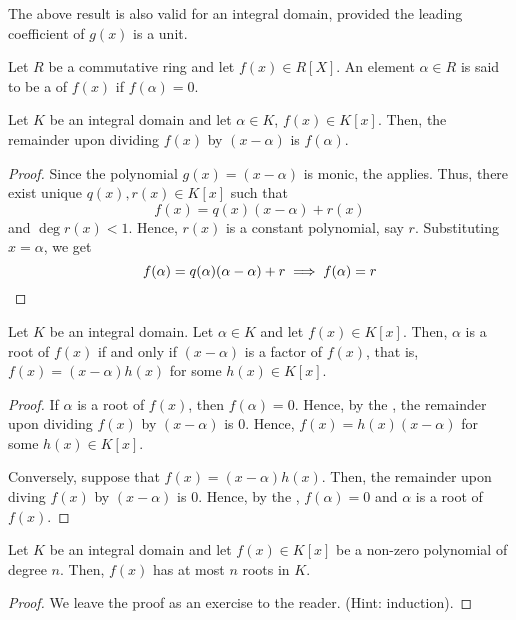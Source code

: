 \begin{rem}
The above result is also valid for an integral domain, provided the leading coefficient of $g(x)$ is a unit.
\end{rem}

\begin{defn}[Root]
    Let $R$ be a commutative ring and let $f(x) \in R[X]$. An element $\alpha \in R$ is said to be a  of $f(x)$ if $f(\alpha) = 0$.
\end{defn}

\begin{theorem} \label{thm:remainder-theorem}
    Let $K$ be an integral domain and let $\alpha \in K$, $f(x) \in K[x]$. Then, the remainder upon dividing $f(x)$ by $(x-\alpha)$ is $f(\alpha)$.
\end{theorem}
\begin{proof}
    Since the polynomial $g(x) = (x-\alpha)$ is monic, the  applies. Thus, there exist unique $q(x),r(x) \in K[x]$ such that
    \[
        f(x) = q(x)(x-\alpha) + r(x)
    \]
    and $\deg r(x) < 1$. Hence, $r(x)$ is a constant polynomial, say $r$. Substituting $x = \alpha$, we get
    \[
        f(\alpha) = q(\alpha) (\alpha - \alpha) + r \implies f(\alpha) = r \qedhere
    \]
\end{proof}

\begin{theorem} \label{thm:factor-theorem}
    Let $K$ be an integral domain. Let $\alpha \in K$ and let $f(x) \in K[x]$. Then, $\alpha$ is a root of $f(x)$ if and only if $(x-\alpha)$ is a factor of $f(x)$, that is, $f(x) = (x-\alpha)h(x)$ for some $h(x) \in K[x]$.
\end{theorem}
\begin{proof}
    If $\alpha$ is a root of $f(x)$, then $f(\alpha) = 0$. Hence, by the , the remainder upon dividing $f(x)$ by $(x-\alpha)$ is $0$. Hence, $f(x) = h(x)(x-\alpha)$ for some $h(x) \in K[x]$.
    
    Conversely, suppose that $f(x) = (x-\alpha)h(x)$. Then, the remainder upon diving $f(x)$ by $(x-\alpha)$ is $0$. Hence, by the , $f(\alpha) = 0$ and $\alpha$ is a root of $f(x)$.
\end{proof}

\begin{cor}
    Let $K$ be an integral domain and let $f(x) \in K[x]$ be a non-zero polynomial of degree $n$. Then, $f(x)$ has at most $n$ roots in $K$.
\end{cor}
\begin{proof}
    We leave the proof as an exercise to the reader. (Hint: induction).
\end{proof}

